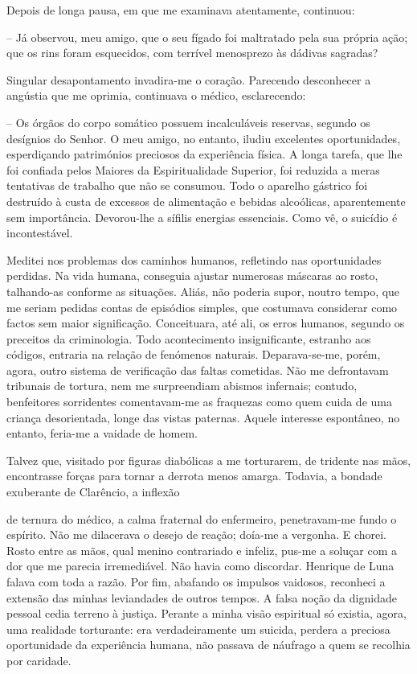 \documentclass[portuguese,12pt,a4paper]{scrbook}
\begin{document}
	Depois de longa pausa, em que me examinava atentamente, continuou:
	
	
	– Já observou, meu amigo, que o seu fígado foi maltratado pela sua própria ação; que os rins foram esquecidos, com terrível menosprezo às dádivas sagradas?
	
	Singular desapontamento invadira-me o coração. Parecendo desconhecer a angústia que me oprimia, continuava o médico, esclarecendo:
	
	– Os órgãos do corpo somático possuem incalculáveis reservas, segundo os desígnios do Senhor. O meu amigo, no entanto, iludiu excelentes oportunidades, esperdiçando patrimónios preciosos da experiência física. A longa tarefa, que lhe foi confiada pelos Maiores da Espiritualidade Superior, foi reduzida a meras tentativas de trabalho que não se consumou. Todo o aparelho gástrico foi destruído à custa de excessos de alimentação e bebidas alcoólicas, aparentemente sem importância. Devorou-lhe a sífilis energias essenciais. Como vê, o suicídio é incontestável.
	
	Meditei nos problemas dos caminhos humanos, refletindo nas oportunidades perdidas. Na vida humana, conseguia ajustar numerosas máscaras ao rosto, talhando-as conforme as situações. Aliás, não poderia supor, noutro tempo, que me seriam pedidas contas de episódios simples, que costumava considerar como factos sem maior significação. Conceituara, até ali, os erros humanos, segundo os preceitos da criminologia. Todo acontecimento insignificante, estranho aos códigos, entraria na relação de fenómenos naturais. Deparava-se-me, porém, agora, outro sistema de verificação das faltas cometidas. Não me defrontavam tribunais de tortura, nem me surpreendiam abismos infernais; contudo, benfeitores sorridentes comentavam-me as fraquezas como quem cuida de uma criança desorientada, longe das vistas paternas. Aquele interesse espontâneo, no entanto, feria-me a vaidade de homem.
	
	Talvez que, visitado por figuras diabólicas a me torturarem, de tridente nas mãos, encontrasse forças para tornar a derrota menos amarga. Todavia, a bondade exuberante de Clarêncio, a inflexão
	
	
	de ternura do médico, a calma fraternal do enfermeiro, penetravam-me fundo o espírito. Não me dilacerava o desejo de reação; doía-me a vergonha. E chorei. Rosto entre as mãos, qual menino contrariado e infeliz, pus-me a soluçar com a dor que me parecia irremediável. Não havia como discordar. Henrique de Luna falava com toda a razão. Por fim, abafando os impulsos vaidosos, reconheci a extensão das minhas leviandades de outros tempos. A falsa noção da dignidade pessoal cedia terreno à justiça. Perante a minha visão espiritual só existia, agora, uma realidade torturante: era verdadeiramente um suicida, perdera a preciosa oportunidade da experiência humana, não passava de náufrago a quem se recolhia por caridade.
	
\end{document}
